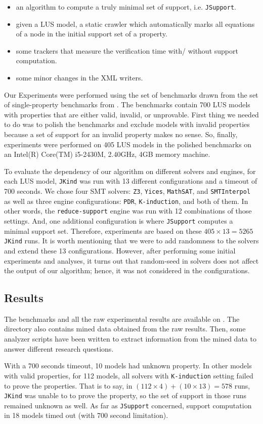 \begin{itemize}
    \item an algorithm to compute a truly minimal set of support, i.e. \texttt{JSupport}.
    \item given a LUS model, a static crawler which automatically marks all equations of a node in the initial support set of a property.
    \item some trackers that measure the verification time with/ without support computation.
    \item some minor changes in the XML writers.
\end{itemize}

Our Experiments were performed using the set of benchmarks drawn from the set of single-property benchmarks from \cite{benchmarks}. The benchmarks contain 700 LUS models with properties that are either valid, invalid, or unprovable. First thing we needed to do was to polish the benchmarks and exclude models with invalid properties because a set of support for an invalid property makes no sense. So, finally, experiments were performed on 405 LUS models in the polished benchmarks on an Intel(R) Core(TM) i5-2430M, 2.40GHz, 4GB memory machine.

To evaluate the dependency of our algorithm on different solvers and engines, for each LUS model, \texttt{JKind} was run with 13 different configurations and a timeout of 700 seconds. We chose four SMT solvers: \texttt{Z3}, \texttt{Yices}, \texttt{MathSAT}, and \texttt{SMTInterpol} as well as three engine configurations: \texttt{PDR},
\texttt{K-induction}, and both of them. In other words, the \texttt{reduce-support} engine was run with 12 combinations of those settings. And, one additional configuration is where \texttt{JSupport} computes a minimal support set. Therefore, experiments are based on these $405 \times 13 = 5265$ \texttt{JKind} runs. It is worth mentioning that we were to add randomness to the solvers and extend these 13 configurations. However, after performing some initial experiments and analyses, it turns out that random-seed in solvers does not affect the output of our algorithm; hence, it was not considered in the configurations.

\subsection{Results}
The benchmarks and all the raw experimental results are available on \cite{expr}. The directory also contains mined data obtained from the raw results. Then, some analyzer scripts have been written to extract information from the mined data to answer different research questions.

With a 700 seconds timeout, 10 models had unknown property. In other models with valid properties, for 112 models, all solvers with \texttt{K-induction} setting failed to prove the properties. That is to say, in $(112 \times 4) + (10 \times 13) = 578$ runs, \texttt{JKind} was unable to to prove the property, so the set of support in those runs remained unknown as well. As far as \texttt{JSupport} concerned, support computation in 18 models timed out (with 700 second limitation).




